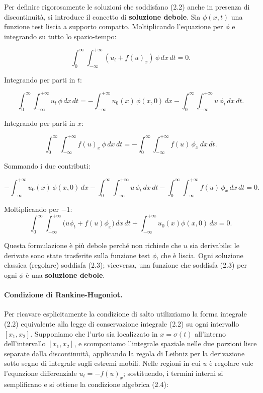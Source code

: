 \documentclass[12pt]{article}
\begin{document}
Per definire rigorosamente le soluzioni che soddisfano (2.2) anche in presenza
di discontinuità, si introduce il concetto di \textbf{soluzione debole}.
Sia \(\phi(x,t)\) una funzione test liscia a supporto compatto. Moltiplicando l'equazione per \(\phi\) e integrando su tutto lo spazio-tempo:

\[
\int_0^\infty \int_{-\infty}^{+\infty} (u_t + f(u)_x)\,\phi \, dx\,dt = 0.
\]

Integrando per parti in \(t\):

\[
\int_0^\infty \int_{-\infty}^{+\infty} u_t\,\phi \, dx\,dt 
= - \int_{-\infty}^{+\infty} u_0(x)\,\phi(x,0) \, dx - \int_0^\infty \int_{-\infty}^{+\infty} u\,\phi_t \, dx\,dt.
\]

Integrando per parti in \(x\):

\[
\int_0^\infty \int_{-\infty}^{+\infty} f(u)_x\,\phi \, dx\,dt
= - \int_0^\infty \int_{-\infty}^{+\infty} f(u)\,\phi_x \, dx\,dt.
\]

Sommando i due contributi:

\[
- \int_{-\infty}^{+\infty} u_0(x)\,\phi(x,0) \, dx
- \int_0^\infty \int_{-\infty}^{+\infty} u\,\phi_t \, dx\,dt
- \int_0^\infty \int_{-\infty}^{+\infty} f(u)\,\phi_x \, dx\,dt = 0.
\]

Moltiplicando per \(-1\):
\[
\int_0^\infty\int_{-\infty}^{+\infty} \bigl(u\phi_t + f(u)\phi_x\bigr)\,dx\,dt
+ \int_{-\infty}^{+\infty} u_0(x)\phi(x,0)\,dx = 0.
\tag{2.3}
\]

Questa formulazione è più debole perché non richiede che $u$ sia derivabile:
le derivate sono state trasferite sulla funzione test $\phi$, che è liscia.
Ogni soluzione classica (regolare) soddisfa (2.3); viceversa, una funzione
che soddisfa (2.3) per ogni $\phi$ è una \textbf{soluzione debole}.

\paragraph{Condizione di Rankine-Hugoniot.}
Per ricavare esplicitamente la condizione di salto utilizziamo la forma integrale (2.2) equivalente alla legge di conservazione integrale (2.2) su ogni intervallo \([x_1,x_2]\). Supponiamo che l'urto sia localizzato in \(x=\sigma(t)\) all'interno dell'intervallo \([x_1,x_2]\), e scomponiamo l'integrale spaziale nelle due porzioni lisce separate dalla discontinuità, applicando la regola di Leibniz per la derivazione sotto segno di integrale sugli estremi mobili. Nelle regioni in cui \(u\) è regolare vale l'equazione differenziale \(u_t=-f(u)_x\); sostituendo, i termini interni si semplificano e si ottiene la condizione algebrica (2.4):
\end{document}
